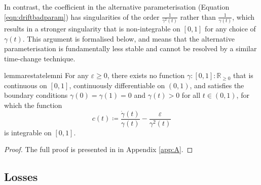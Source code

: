 In contrast, the coefficient in the alternative parameterisation (Equation \ref{eqn:driftbadparam}) has singularities of the order \(\frac{1}{\gamma^{2}(t)}\) rather than \(\frac{1}{\gamma(t)}\), which results in a stronger singularity that is non-integrable on \([0, 1]\) for any choice of \(\gamma(t)\). This argument is formalised below, and means that the alternative parameterisation is fundamentally less stable and cannot be resolved by a similar time-change technique.

\begin{restatable}{lemma}{restatelemni}\label{lem:ni}
  For any \(\varepsilon \geq 0\), there exists no function \(\gamma : [0, 1] : \mathbb{R}_{\geq 0}\) that is continuous on \([0,1]\), continuously differentiable on \((0, 1)\), and satisfies the boundary conditions \(\gamma(0) = \gamma(1) = 0\) and \(\gamma(t) > 0\) for all \(t \in (0, 1)\), for which the function
  \[
    c(t) \coloneqq \frac{\dot{\gamma}(t)}{\gamma(t)} - \frac{\varepsilon}{\gamma^{2}(t)}
  \]
  is integrable on \([0, 1]\).
\end{restatable}
\begin{proof}
  The full proof is presented in  in Appendix \ref{app:A}.
\end{proof}

\subsection{Losses}

